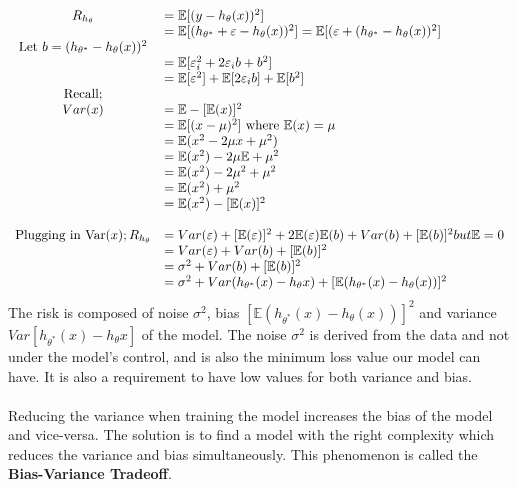 \documentclass[12pt,a4paper,titlepage,landscape]{book}
\begin{document}
	\begin{equation}
	\begin{array}{cl}
		R_{h_\theta} &= \mathbb{E}[(y-h_\theta(x))^2] \\
		&= \mathbb{E}[(h_{\theta^*} + \varepsilon -h_{\theta}(x))^2] =
		\mathbb{E}[(\varepsilon + (h_{\theta^*}  -h_{\theta}(x))^2] \\
		\text{Let}~b = (h_{\theta^*}  -h_{\theta}(x))^2 \\
		&= \mathbb{E}[\varepsilon_i^2 + 2\varepsilon_i{b} + b^2] \\
		&= \mathbb{E}[\varepsilon^2] + \mathbb{E}[2\varepsilon_i{b}] + \mathbb{E}[b^2] \\
		\linebreak
		\text{Recall;} \\
		Var(x) &= \mathbb{E} - [\mathbb{E}(x)]^2 \\
		&= \mathbb{E}[(x - \mu)^2] ~ \text{where} ~ \mathbb{E}(x) = \mu \\
		&= \mathbb{E}(x^2 -2\mu{x}+\mu^2) \\
		&= \mathbb{E}(x^2)-2\mu\mathbb{E} + \mu^2 \\
		&= \mathbb{E}(x^2)-2\mu^2 + \mu^2 \\
		&= \mathbb{E}(x^2) + \mu^2 \\
		&= \mathbb{E}(x^2)-[\mathbb{E}(x)]^2 \\\\
		\text{Plugging in Var}(x);
		R_{h_\theta} &= Var(\varepsilon) + [\mathbb{E}(\varepsilon)]^2 + 2\mathbb{E}(\varepsilon)\mathbb{E}(b) + Var(b) + [\mathbb{E}(b)]^2 but \mathbb{E} = 0 \\
		&= Var(\varepsilon) + Var(b) + [\mathbb{E}(b)]^2 \\
		&= \sigma^2 + Var(b) + [\mathbb{E}(b)]^2 \\
		&= \sigma^2 + Var(h_{\theta^*}(x) - h_\theta{x}) + [\mathbb{E}(h_{\theta^*}(x) - h_\theta(x))]^2
				
	\end{array}
	\end{equation}
	The risk is composed of noise $\sigma^2$, bias
	$[\mathbb{E}(h_{\theta^*}(x) - h_\theta(x))]^2$ and variance $Var[h_{\theta^*}(x) - h_\theta{x}]$ of the model. The noise $\sigma^2$ is derived from the data and not under the model's control, and is also the minimum loss value our model can have. It is also a requirement to have low values for both variance and bias. \\\\
	Reducing the variance when training the model increases the bias of the model and vice-versa. The solution is to find a model with the right complexity which reduces the variance and bias simultaneously. This phenomenon is called the \textbf{Bias-Variance Tradeoff}.
\end{document}

